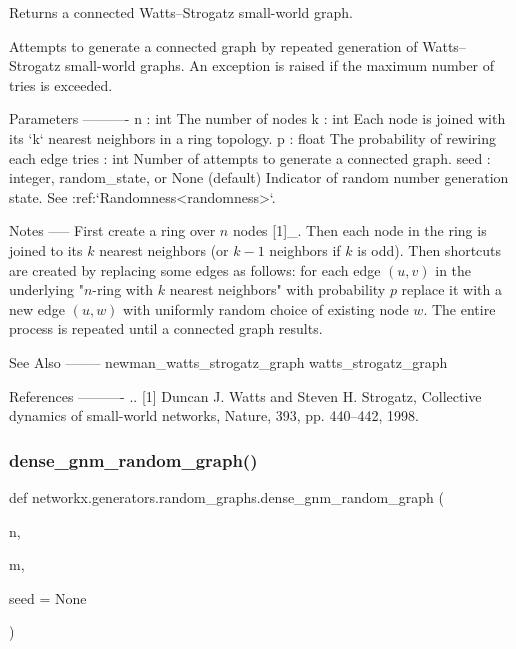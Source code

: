 \begin{DoxyVerb}Returns a connected Watts–Strogatz small-world graph.

Attempts to generate a connected graph by repeated generation of
Watts–Strogatz small-world graphs.  An exception is raised if the maximum
number of tries is exceeded.

Parameters
----------
n : int
    The number of nodes
k : int
    Each node is joined with its `k` nearest neighbors in a ring
    topology.
p : float
    The probability of rewiring each edge
tries : int
    Number of attempts to generate a connected graph.
seed : integer, random_state, or None (default)
    Indicator of random number generation state.
    See :ref:`Randomness<randomness>`.

Notes
-----
First create a ring over $n$ nodes [1]_.  Then each node in the ring is joined
to its $k$ nearest neighbors (or $k - 1$ neighbors if $k$ is odd).
Then shortcuts are created by replacing some edges as follows: for each
edge $(u, v)$ in the underlying "$n$-ring with $k$ nearest neighbors"
with probability $p$ replace it with a new edge $(u, w)$ with uniformly
random choice of existing node $w$.
The entire process is repeated until a connected graph results.

See Also
--------
newman_watts_strogatz_graph
watts_strogatz_graph

References
----------
.. [1] Duncan J. Watts and Steven H. Strogatz,
   Collective dynamics of small-world networks,
   Nature, 393, pp. 440--442, 1998.
\end{DoxyVerb}
 \mbox{\label{namespacenetworkx_1_1generators_1_1random__graphs_a94e5658ef96de443b634239211f06c72}} 
\subsubsection{\texorpdfstring{dense\+\_\+gnm\+\_\+random\+\_\+graph()}{dense\_gnm\_random\_graph()}}
{\footnotesize\ttfamily def networkx.\+generators.\+random\+\_\+graphs.\+dense\+\_\+gnm\+\_\+random\+\_\+graph (\begin{DoxyParamCaption}\item[{}]{n,  }\item[{}]{m,  }\item[{}]{seed = {\ttfamily None} }\end{DoxyParamCaption})}

